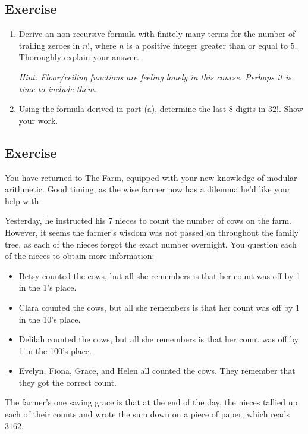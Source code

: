 \documentclass{article}
\newcounter{counter}
\newcommand{\Exercise}{Exercise \stepcounter{counter}\thecounter}
\begin{document}
\subsection*{\Exercise}
    \begin{enumerate}
        \item Derive an non-recursive formula with finitely many terms for the number of trailing zeroes in $n!$, where $n$ is a positive integer greater than or equal to $5$. Thoroughly explain your answer. 
        
        \vspace{.5mm} {\small \textit{Hint: Floor/ceiling functions are feeling lonely in this course. Perhaps it is time to include them.}}
        \item Using the formula derived in part (a), determine the last \underline{8} digits in $32!$. Show your work.
    \end{enumerate}

\subsection*{\Exercise}
    You have returned to The Farm, equipped with your new knowledge of modular arithmetic. Good timing, as the wise farmer now has a dilemma he'd like your help with. 
    
    \hspace{15pt} Yesterday, he instructed his 7 nieces to count the number of cows on the farm. However, it seems the farmer's wisdom was not passed on throughout the family tree, as each of the nieces forgot the exact number overnight. You question each of the nieces to obtain more information:
    \begin{itemize}
        \item Betsy counted the cows, but all she remembers is that her count was off by 1 in the 1’s place. 
        \item Clara counted the cows, but all she remembers is that her count was off by 1 in the 10’s place.
        \item Delilah counted the cows, but all she remembers is that her count was off by 1 in the 100’s place. 
        \item Evelyn, Fiona, Grace, and Helen all counted the cows. They remember that they got the correct count.
    \end{itemize}
    The farmer's one saving grace is that at the end of the day, the nieces tallied up each of their counts and wrote the sum down on a piece of paper, which reads $3162$.
    
\end{document}

